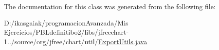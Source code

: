The documentation for this class was generated from the following file\+:\begin{DoxyCompactItemize}
\item 
D\+:/ikasgaiak/programacion\+Avanzada/\+Mis Ejercicios/\+P\+B\+Ldefinitibo2/libs/jfreechart-\/1../source/org/jfree/chart/util/\mbox{\hyperlink{_export_utils_8java}{Export\+Utils.\+java}}\end{DoxyCompactItemize}
